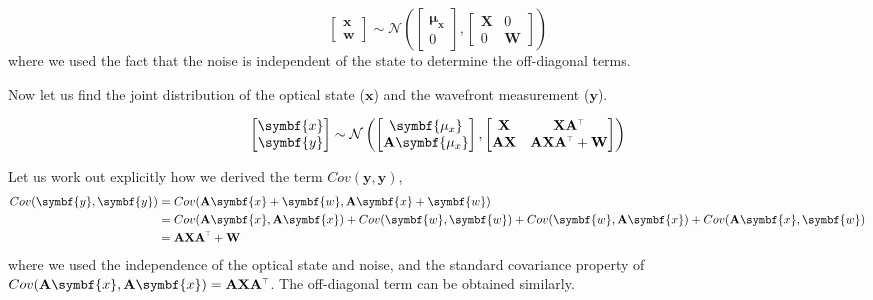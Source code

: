 \documentclass[SE,authoryear,toc]{lsstdoc}
\renewcommand{\v}[1]{\mathbf{#1}}
\newcommand{\tr}{\scalebox{0.6}{$\top$}}
\begin{document}
\begin{equation}
    \begin{bmatrix}
        \symbf{x} \\
        \symbf{w}
    \end{bmatrix}
    \sim \mathcal{N} \left(
    \begin{bmatrix}
        \symbf{\mu_x} \\
        0
    \end{bmatrix},
    \begin{bmatrix}
        \v{X} & 0 \\
        0 & \v{W}
    \end{bmatrix}
    \right) 
\end{equation}
where we used the fact that the noise is independent of the state to determine the off-diagonal terms.

Now let us find the joint distribution of the optical state ($\symbf{x}$) and the wavefront measurement ($\symbf{y}$). 

\begin{equation}
    \begin{bmatrix}
        \symbf{x} \\
        \symbf{y}
    \end{bmatrix}
    \sim \mathcal{N} \left(
    \begin{bmatrix}
        \symbf{\mu_x} \\
        \v{A}\symbf{\mu_x}
    \end{bmatrix},
    \begin{bmatrix}
        \v{X} & \v{X}\v{A}^{\tr} \\
        \v{A}\v{X} & \v{A}\v{X}\v{A}^{\tr} + \v{W}
    \end{bmatrix}
    \right) 
\end{equation}

Let us work out explicitly how we derived the term $Cov(\symbf{y}, \symbf{y})$,
\begin{equation}\label{eq14}
\begin{split}
    Cov(\symbf{y}, \symbf{y}) & = Cov(\v{A}\symbf{x} + \symbf{w}, \v{A}\symbf{x} + \symbf{w}) \\
    & = Cov(\v{A}\symbf{x}, \v{A}\symbf{x}) + Cov(\symbf{w}, \symbf{w}) + Cov(\symbf{w}, \v{A}\symbf{x}) + Cov(\v{A}\symbf{x}, \symbf{w}) \\ 
    &= \v{A}\v{X}\v{A}^{\tr} + \v{W}
\end{split}
\end{equation}
where we used the independence of the optical state and noise, and the standard covariance property of $Cov(\v{A}\symbf{x}, \v{A}\symbf{x}) = \v{A}\v{X}\v{A}^{\tr}$. The off-diagonal term can be obtained similarly. 
\end{document}
